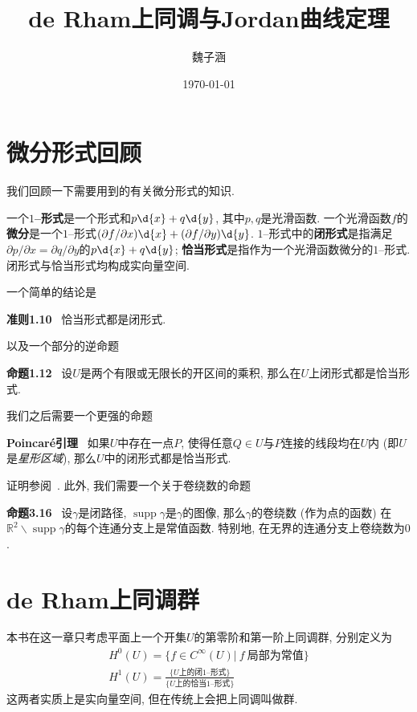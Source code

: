 \documentclass[11pt]{article}
\title{de Rham上同调与Jordan曲线定理}
\author{魏子涵}
\date{\today}
\theoremstyle{definition}\newtheorem*{analyse}{分析}
\theoremstyle{remark}\newtheorem{rem*}{评注}
\newenvironment{env}[1]{\par\vspace{1em}\noindent\textbf{#1}\ }{\par\vspace{1em}}
\DeclareMathOperator{\supp}{supp}
\begin{document}
\maketitle

\setcounter{section}{-1}
\section{微分形式回顾}
我们回顾一下需要用到的有关微分形式的知识.

一个\textbf{$1$--形式}是一个形式和$p\d{x}+q\d{y}$, 其中$p,q$是光滑函数.
一个光滑函数$f$的\textbf{微分}是一个$1$--形式$(\partial f/\partial x)\d{x}+(\partial f/\partial y)\d{y}$.
$1$--形式中的\textbf{闭形式}是指满足$\partial p/\partial x=\partial q/\partial y$的$p\d{x}+q\d{y}$;
\textbf{恰当形式}是指作为一个光滑函数微分的$1$--形式.
闭形式与恰当形式均构成实向量空间.

一个简单的结论是
\begin{env}{准则1.10}
    恰当形式都是闭形式. \cite[p.\ 10]{Fulton1995}
\end{env}

以及一个部分的逆命题
\begin{env}{命题1.12}
    设$U$是两个有限或无限长的开区间的乘积, 那么在$U$上闭形式都是恰当形式.
\end{env}

我们之后需要一个更强的命题
\begin{env}{Poincar\'{e}引理}
    如果$U$中存在一点$P$, 使得任意$Q\in U$与$P$连接的线段均在$U$内 (即$U$是\textit{星形区域}), 那么$U$中的闭形式都是恰当形式.
\end{env}

证明参阅~\cite[定理4.11]{Spivak1965}.
此外, 我们需要一个关于卷绕数的命题
\begin{env}{命题3.16}
    设$\gamma$是闭路径, $\supp\gamma$是$\gamma$的图像,
    那么$\gamma$的卷绕数 (作为点的函数) 在$\mathbb{R}^2\backslash\supp\gamma$的每个连通分支上是常值函数.
    特别地, 在无界的连通分支上卷绕数为$0$.
\end{env}

\section{de Rham上同调群}
本书在这一章只考虑平面上一个开集$U$的第零阶和第一阶上同调群, 分别定义为
\begin{gather*}
    H^0(U)=\{f\in C^\infty(U)|\ f\ \text{局部为常值}\}\\
    H^1(U)=\frac{\{U\text{上的闭}1\text{--形式}\}}{\{U\text{上的恰当}1\text{--形式}\}}
\end{gather*}
这两者实质上是实向量空间, 但在传统上会把上同调叫做群.
\end{document}
